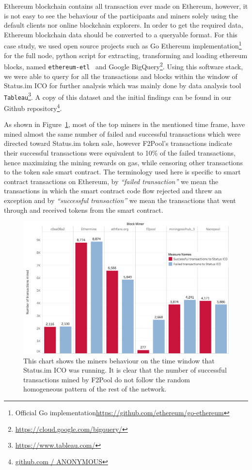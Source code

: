 Ethereum blockchain contains all transaction ever made on Ethereum, however, it is not easy to see the behaviour of the participants and miners solely using the default clients nor online blockchain explorers. In order to get the required data, Ethereum blockchain data should be converted to a queryable format. For this case study, we used open source projects such as Go Ethereum implementation\footnote{Official Go implementation\url{https://github.com/ethereum/go-ethereum}} for the full node, python script for extracting, transforming and loading ethereum blocks, named \texttt{ethereum-etl}~\cite{ethereumetl} and Google BigQuery\footnote{\url{https://cloud.google.com/bigquery/}}. Using this software stack, we were able to query for all the transactions and blocks within the window of Status.im ICO for further analysis which was mainly done by data analysis tool \texttt{Tableau}\footnote{\url{https://www.tableau.com/}}. A copy of this dataset and the initial findings can be found in our Github repository\footnote{\url{github.com / ANONYMOUS}}. 

As shown in Figure~\ref{fig:Transactions_miners_while_status_ico_cut}, most of the top miners in the mentioned time frame, have mined almost the same number of failed and successful transactions which were directed toward Status.im token sale, however F2Pool's transactions indicate their successful transactions were equivalent to 10\% of the failed transactions, hence maximizing the mining rewards on gas, while censoring other transactions to the token sale smart contract. The terminology used here is specific to smart contract transactions on Ethereum, by \textit{``failed transaction''} we mean the transactions in which the smart contract code flow rejected and threw an exception and by \textit{``successful transaction''} we mean the transactions that went through and received tokens from the smart contract. 


\begin{figure}[h]
\centering
\includegraphics[width=0.7\linewidth]{figures/Transactions_miners_while_status_ico_cut_only_icotx.png}
\caption{This chart shows the miners behaviour on the time window that Status.im ICO was running. It is clear that the number of successful transactions mined by F2Pool do not follow the random homogeneous pattern of the rest of the network. \label{fig:Transactions_miners_while_status_ico_cut}} 
\end{figure}

